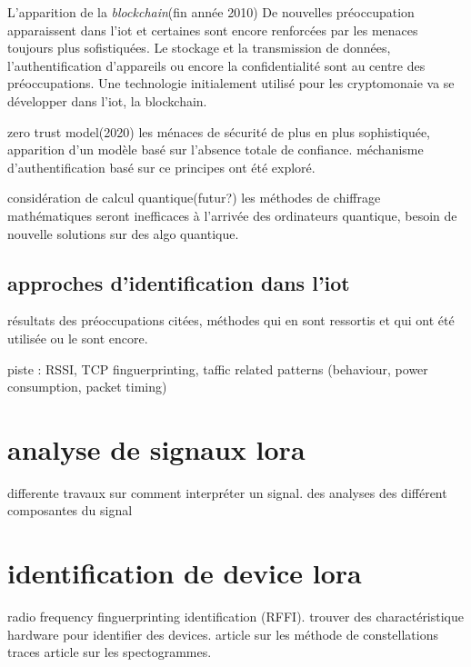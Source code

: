 L'apparition de la \textit{blockchain}(fin année 2010)
De nouvelles préoccupation apparaissent dans l'iot et certaines sont encore renforcées par les menaces toujours plus sofistiquées. Le stockage et la transmission de données, l'authentification d'appareils ou encore la confidentialité sont au centre des préoccupations. Une technologie initialement utilisé pour les cryptomonaie va se développer dans l'iot, la blockchain. 

zero trust model(2020) les ménaces de sécurité de plus en plus sophistiquée, apparition d'un modèle basé sur l'absence totale de confiance. méchanisme d'authentification basé sur ce principes ont été exploré.

considération de calcul quantique(futur?)
les méthodes de chiffrage mathématiques seront inefficaces à l'arrivée des ordinateurs quantique, besoin de nouvelle solutions sur des algo quantique.

\subsection{approches d'identification dans l'iot}

résultats des préoccupations citées, méthodes qui en sont ressortis et qui ont été utilisée ou le sont encore.

piste : RSSI, TCP finguerprinting, taffic related patterns (behaviour, power consumption, packet timing) 

\section{analyse de signaux lora}

differente travaux sur comment interpréter un signal. des analyses des différent composantes du signal 

\section{identification de device lora}

radio frequency finguerprinting identification (RFFI). trouver des charactéristique hardware pour identifier des devices.
article sur les méthode de constellations traces
article sur les spectogrammes.